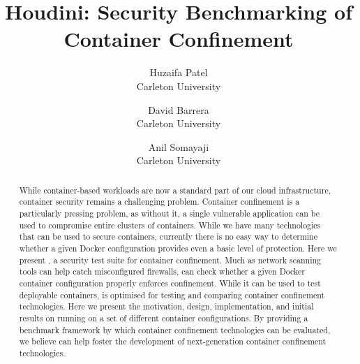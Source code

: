 \documentclass[letterpaper,twocolumn,10pt]{article}
\begin{document}


\title{\Large \bf Houdini: Security Benchmarking of Container Confinement}
\author{
{\rm Huzaifa Patel}\\
Carleton University
\and
{\rm David Barrera}\\
Carleton University
\and
{\rm Anil Somayaji}\\
Carleton University
} %

\maketitle

\begin{abstract}
  While container-based workloads are now a standard part of our cloud infrastructure, container security remains a challenging problem. Container confinement is a particularly pressing problem, as without it, a single vulnerable application can be used to compromise entire clusters of containers. While we have many technologies that can be used to secure containers, currently there is no easy way to determine whether a given Docker configuration provides even a basic level of protection. Here we present \houdini, a security test suite for container confinement. Much as network scanning tools can help catch misconfigured firewalls, \houdini can check whether a given Docker container configuration properly enforces confinement. While it can be used to test deployable containers, \houdini is optimised for testing and comparing container confinement technologies. Here we present the motivation, design, implementation, and initial results on running \houdini on a set of different container configurations. By providing a benchmark framework by which container confinement technologies can be evaluated, we believe \houdini can help foster the development of next-generation container confinement technologies.
\end{abstract}







% 





\end{document}

